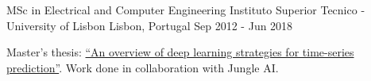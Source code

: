 

\begin{cventries}

  \cventry
    {MSc in Electrical and Computer Engineering} %
    {Instituto Superior Tecnico - University of Lisbon} %
    {Lisbon, Portugal} %
    {Sep 2012 - Jun 2018} %
    {
      \begin{cvitems} %
        \item {Master's thesis: \href{https://fenix.tecnico.ulisboa.pt/downloadFile/563345090416188/Thesis.pdf}{``An overview of deep learning strategies for time-series prediction''}. Work done in collaboration with Jungle AI.}
      \end{cvitems}
    }
\end{cventries}
